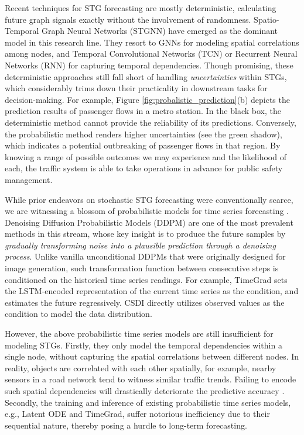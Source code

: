 {\par Recent techniques for STG forecasting are mostly deterministic, calculating future graph signals exactly without the involvement of randomness. Spatio-Temporal Graph Neural Networks (STGNN) have emerged as the dominant model in this research line. They resort to GNNs for modeling spatial correlations among nodes, and Temporal Convolutional Networks (TCN) or Recurrent Neural Networks (RNN) for capturing temporal dependencies. Though promising, these deterministic approaches still fall short of handling \emph{uncertainties} within STGs, which considerably trims down their practicality in downstream tasks for decision-making. For example, Figure \ref{fig:probalistic_prediction}(b) depicts the prediction results of passenger flows in a metro station. In the black box, the deterministic method cannot provide the reliability of its predictions. Conversely, the probabilistic method renders higher uncertainties (see the green shadow), which indicates a potential outbreaking of passenger flows in that region. By knowing a range of possible outcomes we may experience and the likelihood of each, the traffic system is able to take operations in advance for public safety management.

\par While prior endeavors on stochastic STG forecasting were conventionally scarce, we are witnessing a blossom of probabilistic models for time series forecasting \cite{rubanova2019latent,salinas2020deepar,rasul2021autoregressive}. Denoising Diffusion Probabilistic Models (DDPM) \cite{ho2020denoising} are one of the most prevalent methods in this stream, whose key insight is to produce the future samples by \emph{gradually transforming noise into a plausible prediction through a denoising process}. Unlike vanilla unconditional DDPMs that were originally designed for image generation, such transformation function between consecutive steps is conditioned on the historical time series readings. For example, TimeGrad \cite{rasul2021autoregressive} sets the LSTM-encoded representation of the current time series as the condition, and estimates the future regressively. CSDI \cite{tashiro2021csdi} directly utilizes observed values as the condition to model the data distribution.

\par However, the above probabilistic time series models are still insufficient for modeling STGs. Firstly, they only model the temporal dependencies within a single node, without capturing the spatial correlations between different nodes. In reality, objects are correlated with each other spatially, for example, nearby sensors in a road network tend to witness similar traffic trends.  Failing to encode such spatial dependencies will drastically deteriorate the predictive accuracy \cite{STGCN-2018,GraphWaveNet-2019}. Secondly, the training and inference of existing probabilistic time series models, e.g., Latent ODE \cite{rubanova2019latent} and TimeGrad, suffer notorious inefficiency due to their sequential nature, thereby posing a hurdle to long-term forecasting. 

}
